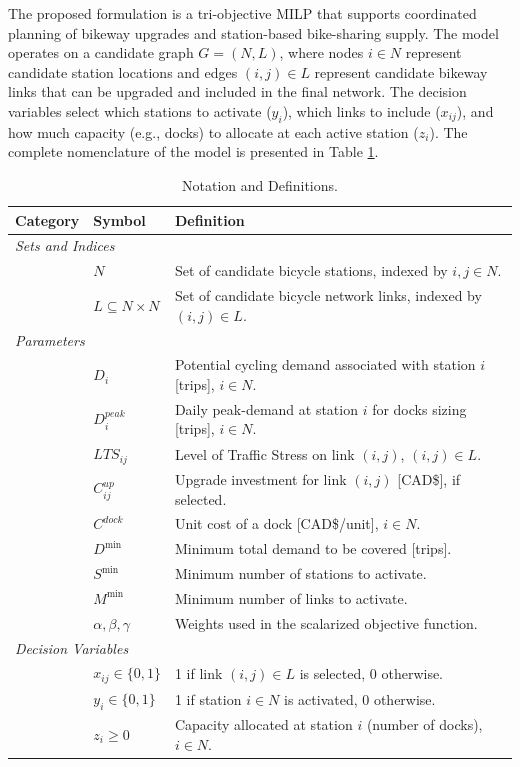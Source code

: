 \documentclass[preprint,authoryear,10pt]{elsarticle}
\begin{document}
The proposed formulation is a tri-objective MILP that supports coordinated planning of bikeway upgrades and station-based bike-sharing supply. The model operates on a candidate graph $G=(N,L)$, where nodes $i\in N$ represent candidate station locations and edges $(i,j)\in L$ represent candidate bikeway links that can be upgraded and included in the final network. The decision variables select which stations to activate ($y_i$), which links to include ($x_{ij}$), and how much capacity (e.g., docks) to allocate at each active station ($z_i$). The complete nomenclature of the model is presented in Table \ref{tab:notation}.

\begin{table}[!ht]
\caption{Notation and Definitions.}
\label{tab:notation}
\centering
\small
\begin{tabularx}{0.85\textwidth}{@{} l l X @{}}
\hline
\textbf{Category} & \textbf{Symbol} & \textbf{Definition} \\
\hline

\multicolumn{3}{l}{\textit{Sets and Indices}} \\
& $N$ & Set of candidate bicycle stations, indexed by $i,j \in N$. \\
& $L \subseteq N \times N$ & Set of candidate bicycle network links, indexed by $(i,j)\in L$. \\
\hline

\multicolumn{3}{l}{\textit{Parameters}} \\
& $D_i$ & Potential cycling demand associated with station $i$ [trips], $i\in N$. \\
& $D_i^{peak}$ & Daily peak-demand at station $i$ for docks sizing [trips], $i\in N$. \\
& $LTS_{ij}$ & Level of Traffic Stress on link $(i,j)$, $(i,j)\in L$. \\
& $C_{ij}^{up}$ & Upgrade investment for link $(i,j)$ [CAD\$], if selected. \\
& $C^{dock}$ & Unit cost of a dock [CAD\$/unit], $i\in N$. \\
& $D^{\min}$ & Minimum total demand to be covered [trips]. \\
& $S^{\min}$ & Minimum number of stations to activate. \\
& $M^{\min}$ & Minimum number of links to activate. \\
& $\alpha,\beta,\gamma$ & Weights used in the scalarized objective function. \\
\hline

\multicolumn{3}{l}{\textit{Decision Variables}} \\
& $x_{ij}\in\{0,1\}$ & 1 if link $(i,j)\in L$ is selected, 0 otherwise. \\
& $y_i\in\{0,1\}$ & 1 if station $i\in N$ is activated, 0 otherwise. \\
& $z_i \ge 0$ & Capacity allocated at station $i$ (number of docks), $i\in N$. \\
\hline
\end{tabularx}
\end{table}
\end{document}
